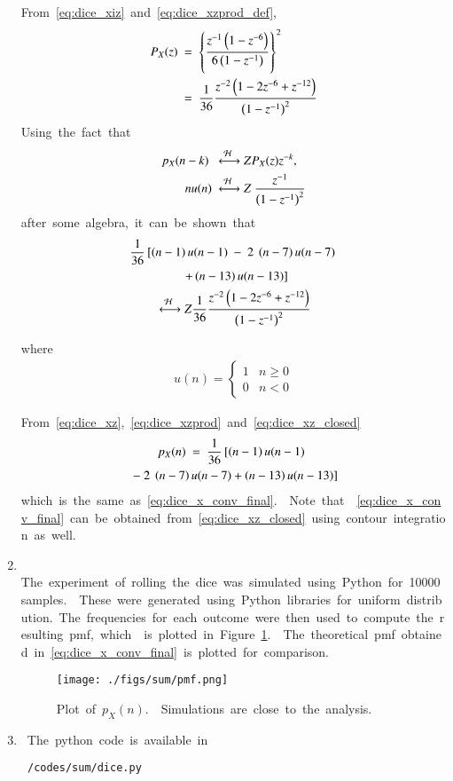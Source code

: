 \documentclass[journal,12pt,twocolumn]{IEEEtran}
\renewcommand\thesection{\arabic{section}}
\begin{document}
\begin{enumerate}[label=\thesection.\arabic*.,ref=\thesection.\theenumi]
 From \eqref{eq:dice_xiz} and \eqref{eq:dice_xzprod_def}, 
 \begin{align} 
 P_X(z) &= \cbrak{\frac{z^{-1}\brak{1-z^{-6}}}{6\brak{1-z^{-1}}}}^2 
 \\ 
 &= \frac{1}{36}\frac{z^{-2}\brak{1-2z^{-6}+z^{-12}}}{\brak{1-z^{-1}}^2} 
 \label{eq:dice_xzprod} 
 \end{align} 
 Using the fact that  
 \begin{align} 
 p_X(n-k) &\system{Z}P_X(z)z^{-k}, 
 \\ 
 nu(n)&\system{Z} \frac{z^{-1}}{\brak{1-z^{-1}}^2} 
 \end{align} 
 after some algebra, it can be shown that 
 \begin{multline} 
 \frac{1}{36}\lsbrak{\brak{n-1}u(n-1) - 2 \brak{n-7}u(n-7)} 
 \\ 
 \rsbrak{ +\brak{n-13}u(n-13)} 
 \\ 
 \system{Z} 
 \frac{1}{36}\frac{z^{-2}\brak{1-2z^{-6}+z^{-12}}}{\brak{1-z^{-1}}^2} 
 \label{eq:dice_xz_closed} 
 \end{multline} 
  
 where  
 \begin{align} 
 u(n) = 
 \begin{cases} 
 1 & n \ge 0 
 \\ 
 0 & n < 0 
 \end{cases} 
 \end{align} 
  
 From \eqref{eq:dice_xz}, \eqref{eq:dice_xzprod} and \eqref{eq:dice_xz_closed} 
 \begin{multline} 
 p_{X}(n) = \frac{1}{36}\lsbrak{\brak{n-1}u(n-1)  
 } 
 \\ 
 \rsbrak{- 2 \brak{n-7}u(n-7)+\brak{n-13}u(n-13)} 
 \end{multline} 
 which is the same as \eqref{eq:dice_x_conv_final}.  Note that  \eqref{eq:dice_x_conv_final} can be obtained from \eqref{eq:dice_xz_closed} using contour integration as well. 
  
 \item  
 The experiment of rolling the dice was simulated using Python for 10000 samples.  These were generated using Python libraries for uniform distribution. The frequencies for each outcome were then used to compute the resulting pmf, which  is plotted in Figure \ref{fig:dice}.  The theoretical pmf obtained in \eqref{eq:dice_x_conv_final} is plotted for comparison.   
 \begin{figure}[!ht] 
 \centering 
 \texttt{[image: ./figs/sum/pmf.png]} 
 \caption{Plot of $p_X(n)$.  Simulations are close to the analysis. } 
 \label{fig:dice} 
 \end{figure} 
 \item The python code is available in  
 \begin{lstlisting} 
 /codes/sum/dice.py 
 \end{lstlisting} 
  

\end{enumerate}
\end{document}
